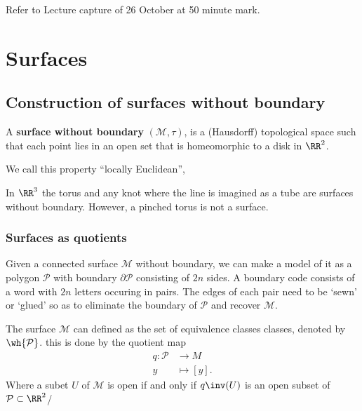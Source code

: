 \documentclass[12pt, a4paper]{article}
\begin{document}
\begin{mdexample}
    Refer to Lecture capture of 26 October at 50 minute mark.
\end{mdexample}

\section{Surfaces}

\subsection{Construction of surfaces without boundary}

\begin{definition}
    A \textbf{surface without boundary} \((\mathcal{M},\tau)\), is a (Hausdorff) topological space such that each point lies in an open set that is homeomorphic to a disk in \(\RR^2\).
\end{definition}

\begin{mdremark}
    We call this property ``locally Euclidean'',
\end{mdremark}

\begin{example}
    In \(\RR^3\) the torus and any knot where the line is imagined as a tube are surfaces without boundary. However, a pinched torus is not a surface.
\end{example}

\subsubsection{Surfaces as quotients}

Given a connected surface \(\mathcal{M}\) without boundary, we can make a model of it as a polygon \(\mathcal{P}\) with boundary \(\partial \mathcal{P}\) consisting of \(2n\) sides. A boundary code consists of a word with \(2n\) letters occuring in pairs. The edges of each pair need to be `sewn' or `glued' so as to eliminate the boundary of \(\mathcal{P}\) and recover \(\mathcal{M}\). 

\begin{definition}
    The surface \(\mathcal{M}\) can defined as the set of equivalence classes classes, denoted by \(\wh{\mathcal{P}}\). this is done by the quotient map 
    \[\begin{aligned}
        q : \mathcal{P} &\to M \\
        y &\mapsto [y].
    \end{aligned}\]
    Where a subet \(U\) of \(\mathcal{M}\) is open if and only if \(q\inv(U)\) is an open subset of \(\mathcal{P} \subset \RR^2\)/
\end{definition}
\end{document}
